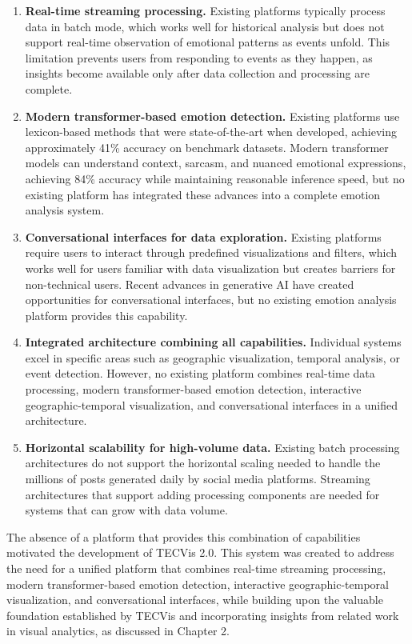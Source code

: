 \begin{enumerate}
\item \textbf{Real-time streaming processing.} Existing platforms typically process data in batch mode, which works well for historical analysis but does not support real-time observation of emotional patterns as events unfold. This limitation prevents users from responding to events as they happen, as insights become available only after data collection and processing are complete.

\item \textbf{Modern transformer-based emotion detection.} Existing platforms use lexicon-based methods that were state-of-the-art when developed, achieving approximately 41\% accuracy on benchmark datasets. Modern transformer models can understand context, sarcasm, and nuanced emotional expressions, achieving 84\% accuracy while maintaining reasonable inference speed, but no existing platform has integrated these advances into a complete emotion analysis system.

\item \textbf{Conversational interfaces for data exploration.} Existing platforms require users to interact through predefined visualizations and filters, which works well for users familiar with data visualization but creates barriers for non-technical users. Recent advances in generative AI have created opportunities for conversational interfaces, but no existing emotion analysis platform provides this capability.

\item \textbf{Integrated architecture combining all capabilities.} Individual systems excel in specific areas such as geographic visualization, temporal analysis, or event detection. However, no existing platform combines real-time data processing, modern transformer-based emotion detection, interactive geographic-temporal visualization, and conversational interfaces in a unified architecture.

\item \textbf{Horizontal scalability for high-volume data.} Existing batch processing architectures do not support the horizontal scaling needed to handle the millions of posts generated daily by social media platforms. Streaming architectures that support adding processing components are needed for systems that can grow with data volume.
\end{enumerate}

The absence of a platform that provides this combination of capabilities motivated the development of TECVis 2.0. This system was created to address the need for a unified platform that combines real-time streaming processing, modern transformer-based emotion detection, interactive geographic-temporal visualization, and conversational interfaces, while building upon the valuable foundation established by TECVis and incorporating insights from related work in visual analytics, as discussed in Chapter 2.

